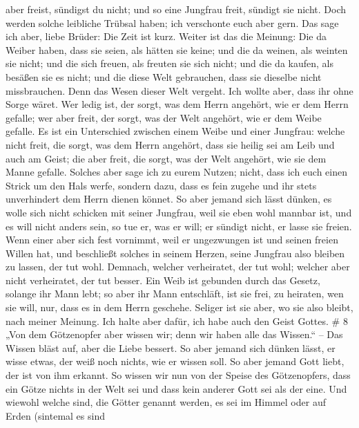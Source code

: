 aber freist, sündigst du nicht; und so eine Jungfrau freit, sündigt sie
nicht. Doch werden solche leibliche Trübsal haben; ich verschonte euch
aber gern.  Das sage ich aber, liebe Brüder: Die Zeit ist
kurz. Weiter ist das die Meinung: Die da Weiber haben, dass sie seien,
als hätten sie keine; und die da weinen, als weinten sie nicht;
 und die sich freuen, als freuten sie sich nicht; und die
da kaufen, als besäßen sie es nicht;  und die diese Welt
gebrauchen, dass sie dieselbe nicht missbrauchen. Denn das Wesen dieser
Welt vergeht.  Ich wollte aber, dass ihr ohne Sorge wäret.
Wer ledig ist, der sorgt, was dem Herrn angehört, wie er dem Herrn
gefalle;  wer aber freit, der sorgt, was der Welt angehört,
wie er dem Weibe gefalle. Es ist ein Unterschied zwischen einem Weibe
und einer Jungfrau:  welche nicht freit, die sorgt, was dem
Herrn angehört, dass sie heilig sei am Leib und auch am Geist; die aber
freit, die sorgt, was der Welt angehört, wie sie dem Manne gefalle.
 Solches aber sage ich zu eurem Nutzen; nicht, dass ich
euch einen Strick um den Hals werfe, sondern dazu, dass es fein zugehe
und ihr stets unverhindert dem Herrn dienen könnet.  So
aber jemand sich lässt dünken, es wolle sich nicht schicken mit seiner
Jungfrau, weil sie eben wohl mannbar ist, und es will nicht anders sein,
so tue er, was er will; er sündigt nicht, er lasse sie freien.
 Wenn einer aber sich fest vornimmt, weil er ungezwungen
ist und seinen freien Willen hat, und beschließt solches in seinem
Herzen, seine Jungfrau also bleiben zu lassen, der tut wohl.
 Demnach, welcher verheiratet, der tut wohl; welcher aber
nicht verheiratet, der tut besser.  Ein Weib ist gebunden
durch das Gesetz, solange ihr Mann lebt; so aber ihr Mann entschläft,
ist sie frei, zu heiraten, wen sie will, nur, dass es in dem Herrn
geschehe.  Seliger ist sie aber, wo sie also bleibt, nach
meiner Meinung. Ich halte aber dafür, ich habe auch den Geist Gottes. \#
8  „Von dem Götzenopfer aber wissen wir; denn wir haben alle
das Wissen.`` -- Das Wissen bläst auf, aber die Liebe bessert.
 So aber jemand sich dünken lässt, er wisse etwas, der weiß
noch nichts, wie er wissen soll.  So aber jemand Gott liebt,
der ist von ihm erkannt.  So wissen wir nun von der Speise
des Götzenopfers, dass ein Götze nichts in der Welt sei und dass kein
anderer Gott sei als der eine.  Und wiewohl welche sind, die
Götter genannt werden, es sei im Himmel oder auf Erden (sintemal es sind

